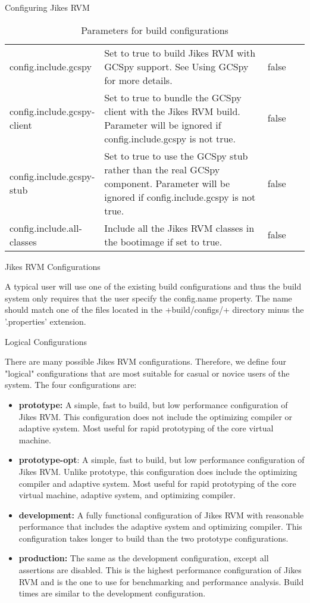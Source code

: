 \begin{section}{Configuring Jikes RVM}
\begin{table}
\begin{tabular}{p{0.25\linewidth}p{0.6\linewidth}p{0.15\linewidth}}
config.include.gcspy & Set to true to build Jikes RVM with GCSpy support. See Using GCSpy for more details. & false \\
config.include.gcspy-client & Set to true to bundle the GCSpy client with the Jikes RVM build. Parameter will be ignored if config.include.gcspy is not true. & false \\
config.include.gcspy-stub & Set to true to use the GCSpy stub rather than the real GCSpy component. Parameter will be ignored if config.include.gcspy is not true. & false \\
config.include.all-classes & Include all the Jikes RVM classes in the bootimage if set to true. & false \\
\end{tabular}
\caption{Parameters for build configurations}
\end{table}

\begin{subsection}{Jikes RVM Configurations}

A typical user will use one of the existing build configurations and thus the build system only requires that the user specify the config.name property. The name should match one of the files located in the \spverb+build/configs/+ directory minus the '.properties' extension.

\begin{subsubsection}{Logical Configurations}

There are many possible Jikes RVM configurations. Therefore, we define four "logical" configurations that are most suitable for casual or novice users of the system. The four configurations are:

\begin{itemize}
  \item \textbf{prototype:} A simple, fast to build, but low performance configuration of Jikes RVM. This configuration does not include the optimizing compiler or adaptive system. Most useful for rapid prototyping of the core virtual machine.
  \item \textbf{prototype-opt}: A simple, fast to build, but low performance configuration of Jikes RVM. Unlike prototype, this configuration does include the optimizing compiler and adaptive system. Most useful for rapid prototyping of the core virtual machine, adaptive system, and optimizing compiler.
  \item \textbf{development:} A fully functional configuration of Jikes RVM with reasonable performance that includes the adaptive system and optimizing compiler. This configuration takes longer to build than the two prototype configurations.
  \item \textbf{production:} The same as the development configuration, except all assertions are disabled. This is the highest performance configuration of Jikes RVM and is the one to use for benchmarking and performance analysis. Build times are similar to the development configuration.
\end{itemize}


\end{subsubsection}
\end{subsection}
\end{section}
